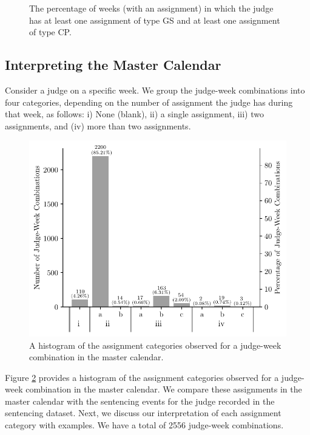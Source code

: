 \documentclass[11pt, oneside]{article}   	%
\theoremstyle{ModifiedStyle}
\begin{document}
\begin{figure}[H]
\begin{minipage}{\textwidth}
		\vspace{-3mm}
		\caption{The percentage of weeks (with an assignment) in which the judge has at least one assignment of type GS and at least one assignment of type CP.}
		\label{Figure_Judge_Schedule_GS_CP_Percentage_Histogram}
	\end{minipage}
\end{figure}

\subsection{Interpreting the Master Calendar}
\label{Sec:Master_Calendar:Interpreting_Master_Calendar}

Consider a judge on a specific week. We group the judge-week combinations into four categories, depending on the number of assignment the judge has during that week, as follows: i) None (blank), ii) a single assignment, iii) two assignments, and (iv) more than two assignments.

\begin{figure}[h!]
	\centering
	\includegraphics[scale=0.75]{Figures/Simultaneous_Assignment_Count_Histogram}
	\caption{A histogram of the assignment categories observed for a judge-week combination in the master calendar.}
	\label{Figure_Simultaneous_Assignment_Count_Histogram}
\end{figure}

Figure \ref{Figure_Simultaneous_Assignment_Count_Histogram} provides a histogram of the assignment categories observed for a judge-week combination in the master calendar. We compare these assignments in the master calendar with the sentencing events for the judge recorded in the sentencing dataset. Next, we discuss our interpretation  of each assignment category with examples. We have a total of 2556 judge-week combinations.
\end{document}
